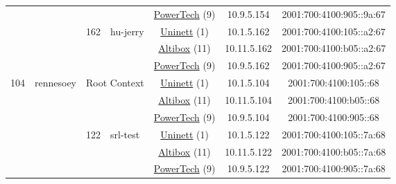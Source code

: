 \begin{small}
\begin{center}
\begin{longtable}{|c|c|c|c|c|c|c|c|}
  &  &  &  & \multicolumn{2}{|c|}{\tiny{\href{http://www.powertech.no}{PowerTech} (9)}} & \tiny{10.9.5.154} & \tiny{2001:700:4100:905::9a:67} \\* \cline{3-3}\cline{4-4}\cline{5-5}\cline{6-6}\cline{7-7}\cline{8-8}
  &  & \multirow{3}{*}{\tiny{162}} & \multicolumn{1}{|l|}{\multirow{3}{*}{\tiny{hu-jerry}}} & \multicolumn{2}{|c|}{\tiny{\href{https://www.uninett.no}{Uninett} (1)}} & \tiny{10.1.5.162} & \tiny{2001:700:4100:105::a2:67} \\* \cline{5-5}\cline{6-6}\cline{7-7}\cline{8-8}
  &  &  &  & \multicolumn{2}{|c|}{\tiny{\href{https://www.altibox.no}{Altibox} (11)}} & \tiny{10.11.5.162} & \tiny{2001:700:4100:b05::a2:67} \\* \cline{5-5}\cline{6-6}\cline{7-7}\cline{8-8}
  &  &  &  & \multicolumn{2}{|c|}{\tiny{\href{http://www.powertech.no}{PowerTech} (9)}} & \tiny{10.9.5.162} & \tiny{2001:700:4100:905::a2:67} \\ \hline
 \multirow{24}{*}{\tiny{104}} & \multicolumn{1}{|l|}{\multirow{24}{*}{\tiny{rennesoey}}} & \multicolumn{2}{|c|}{\multirow{3}{*}{\tiny{Root Context}}} & \multicolumn{2}{|c|}{\tiny{\href{https://www.uninett.no}{Uninett} (1)}} & \tiny{10.1.5.104} & \tiny{2001:700:4100:105::68} \\* \cline{5-5}\cline{6-6}\cline{7-7}\cline{8-8}
  &  & \multicolumn{2}{|c|}{} & \multicolumn{2}{|c|}{\tiny{\href{https://www.altibox.no}{Altibox} (11)}} & \tiny{10.11.5.104} & \tiny{2001:700:4100:b05::68} \\* \cline{5-5}\cline{6-6}\cline{7-7}\cline{8-8}
  &  & \multicolumn{2}{|c|}{} & \multicolumn{2}{|c|}{\tiny{\href{http://www.powertech.no}{PowerTech} (9)}} & \tiny{10.9.5.104} & \tiny{2001:700:4100:905::68} \\* \cline{3-3}\cline{4-4}\cline{5-5}\cline{6-6}\cline{7-7}\cline{8-8}
  &  & \multirow{3}{*}{\tiny{122}} & \multicolumn{1}{|l|}{\multirow{3}{*}{\tiny{srl-test}}} & \multicolumn{2}{|c|}{\tiny{\href{https://www.uninett.no}{Uninett} (1)}} & \tiny{10.1.5.122} & \tiny{2001:700:4100:105::7a:68} \\* \cline{5-5}\cline{6-6}\cline{7-7}\cline{8-8}
  &  &  &  & \multicolumn{2}{|c|}{\tiny{\href{https://www.altibox.no}{Altibox} (11)}} & \tiny{10.11.5.122} & \tiny{2001:700:4100:b05::7a:68} \\* \cline{5-5}\cline{6-6}\cline{7-7}\cline{8-8}
  &  &  &  & \multicolumn{2}{|c|}{\tiny{\href{http://www.powertech.no}{PowerTech} (9)}} & \tiny{10.9.5.122} & \tiny{2001:700:4100:905::7a:68} \\* \cline{3-3}\cline{4-4}\cline{5-5}\cline{6-6}\cline{7-7}\cline{8-8}

\end{longtable}
\end{center}
\end{small}
